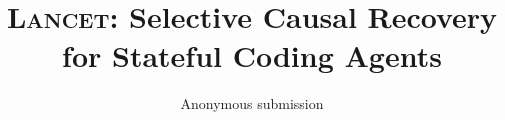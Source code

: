 \documentclass[letterpaper,twocolumn,10pt]{article}
\newcommand{\system}{\textsc{Lancet}\xspace}
\begin{document}
\raggedbottom
\date{}
\title{\Large \bf \system: Selective Causal Recovery for Stateful Coding Agents}
\author{Anonymous submission}
\maketitle






















\normalsize

\end{document}
